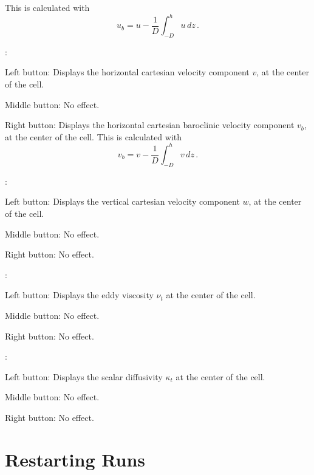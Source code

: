 \documentclass[12pt,oneside]{article}
\begin{document}
\begin{list}{}
\begin{list}{}
This is calculated with
\[
u_b = u - \frac{1}{D}\int_{-D}^h u\,dz\,.
\]
\end{list}
\item {}: 
\begin{list}{}
\item Left button: Displays the horizontal cartesian velocity component $v$, at the center of the cell.
\item Middle button: No effect.
\item Right button: Displays the horizontal cartesian baroclinic velocity component $v_b$, at the center of the cell.
This is calculated with
\[
v_b = v - \frac{1}{D}\int_{-D}^h v\,dz\,.
\]
\end{list}
\item {}: 
\begin{list}{}
\item Left button: Displays the vertical cartesian velocity component $w$, at the center of the cell.
\item Middle button: No effect.
\item Right button: No effect.
\end{list}
\item {}: 
\begin{list}{}
\item Left button: Displays the eddy viscosity $\nu_t$ at the center of the cell.
\item Middle button: No effect.
\item Right button: No effect.
\end{list}
\item {}: 
\begin{list}{}
\item Left button: Displays the scalar diffusivity $\kappa_t$ at the center of the cell.
\item Middle button: No effect.
\item Right button: No effect.
\end{list}
\end{list}

\section{Restarting Runs} \label{sec:restart}
\end{document}

